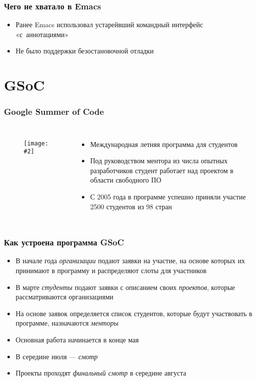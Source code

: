 \documentclass[onlymath]{beamer}
\newcommand\neword\emph
\newcommand{\cenfig}[2]{\begin{figure}\centering\texttt{[image: \#2]}
  \end{figure}}
\begin{document}
\begin{frame}
  \frametitle{Чего не хватало в Emacs}
  \begin{itemize}
  \item Ранее Emacs использовал устарейвший командный интерфейс
    «с аннотациями»
  \item Не было поддержки безостановочной отладки
  \end{itemize}  
\end{frame}

\section{GSoC}
\begin{frame}
  \frametitle{Google Summer of Code}
  \begin{columns}
    \cenfig{0.1}{google.jpg}
  \begin{itemize}
  \item Международная летняя программа для студентов
  \item Под руководством ментора из числа опытных разработчиков
    студент работает над проектом в области свободного \textsc{ПО}
  \item С 2005 года в программе успешно приняли участие 2500 студентов
    из 98 стран
  \end{itemize}
\end{columns}
\end{frame}

\begin{frame}
  \frametitle{Как устроена программа GSoC}
  \begin{itemize}
  \item В начале года \neword{организации} подают заявки на участие,
    на основе которых их принимают в программу и распределяют слоты
    для участников
  \item В марте \neword{студенты} подают заявки с описанием своих
    \neword{проектов}, которые рассматриваются организациями
  \item На основе заявок определяется список студентов, которые будут
    участвовать в программе, назначаются \neword{менторы}
  \item Основная работа начинается в конце мая
  \item В середине июля — \neword{смотр}
  \item Проекты проходят \neword{финальный смотр} в середине августа
  \end{itemize}
\end{frame}
\end{document}
